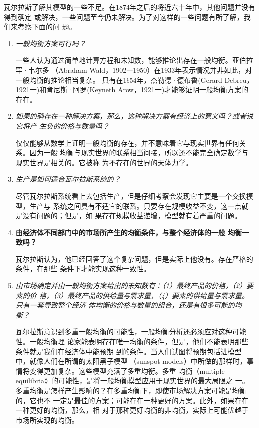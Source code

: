 瓦尔拉斯了解其模型的一些不足。在1874年之后的将近六十年中，其他问题并没有得到确定
或解决，一些问题至今仍未解决。为了对这样的一些问题有所了解，我们来考察下面的问
题。
\begin{enumerate}
\item \textit{一般均衡方案可行吗？}

  一些人认为通过简单地计算方程和未知数，能够推论出存在一般均衡。亚伯拉罕·韦尔多
  （Abraham Wald，1902一1950）在1933年表示情况并非如此，对一般均衡的推论相当复杂。
  只有在1954年，杰勒德·德布鲁(Gerard Debreu，1921一)和肯尼斯·阿罗(Keyneth
  Arow，1921一)才能够证明一般均衡方案的存在。

\item \textit{如果的确存在一种解决方案，那么，这种解决方案有经济上的意义吗？或者说它将产
  生负的价格与数量吗？}

  仅仅能够从数学上证明一般均衡的存在，并不意味着它与现实世界有任何关系。因为一般
  均衡与现实世界的联系相当间接，所以还不能完全确定数学与现实世界是相关的。它被称
  为不存在的世界的天体力学。

\item \textit{生产是如何适合瓦尔拉斯系统的？}

  尽管瓦尔拉斯系统看上去包括生产，但是仔细考察会发现它主要是一个交换模型，生产与
  系统之间具有不适宜的联系。只要存在规模收益不变，这一点就是没有问题的；但是，如
  果存在规模收益递增，模型就有着严重的问题。

\item \textbf{由经济体不同部门中的市场所产生的均衡条件，与整个经济体的一般
均衡一致吗？}

瓦尔拉斯认为，他已经回答了这个复杂问题，但是实际上他没有。存在严格的条件，在那些
条件下才能实现这种一致性。

\item \textit{由市场确定并由一般均衡方案给出的未知数有：（1）最终产品的价格，（2）要素的价
  格，（3）最终产品的供给量与需求量，（4）要素的供给量与需求量。只有一套导致整个经济
  体均衡的价格与数量的组合，还是有很多可能的均衡？}

瓦尔拉斯意识到多重一般均衡的可能性，一般均衡分析还必须应对这种可能性。一般均衡理
论家能表明存在唯一均衡的条件，但是，他们不能表明那些条件就是我们在经济体中能预期
到的条件。当人们试图将预期包括进模型中，就像人们在所谓的太阳黑子模型
（sunspot models）中所做的那样时，事情将变得更加复杂。这些模型充满了多重均衡。多重
均衡（multiple equilibria》的可能性，是将一般均衡模型应用于现实世界的最大局限之
一。多重均衡是怎样产生影响的？在多重均衡下，即使市场解决方案可能是均衡的，它也不
一定是最佳的方案；可能存在一种更好的方案。此外，如果存在一种更好的均衡，那么，相
对于那种更好均衡的非均衡，实际上可能优越于市场所实现的均衡。


\end{enumerate}

